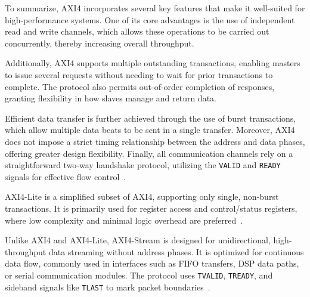 To summarize, AXI4 incorporates several key features that make it well-suited for high-performance systems. One of its core advantages is the use of independent read and write channels, which allows these operations to be carried out concurrently, thereby increasing overall throughput. 

Additionally, AXI4 supports multiple outstanding transactions, enabling masters to issue several requests without needing to wait for prior transactions to complete. The protocol also permits out-of-order completion of responses, granting flexibility in how slaves manage and return data. 

Efficient data transfer is further achieved through the use of burst transactions, which allow multiple data beats to be sent in a single transfer. Moreover, AXI4 does not impose a strict timing relationship between the address and data phases, offering greater design flexibility. Finally, all communication channels rely on a straightforward two-way handshake protocol, utilizing the \texttt{VALID} and \texttt{READY} signals for effective flow control~\cite{st_micheal_introduction_2019, the_art_of_verification_understanding_2021}.


AXI4-Lite is a simplified subset of AXI4, supporting only single, non-burst transactions. It is primarily used for register access and control/status registers, where low complexity and minimal logic overhead are preferred~\cite{arm_amba_2021}.

Unlike AXI4 and AXI4-Lite, AXI4-Stream is designed for unidirectional, high-throughput data streaming without address phases. It is optimized for continuous data flow, commonly used in interfaces such as FIFO transfers, DSP data paths, or serial communication modules. The protocol uses \texttt{TVALID}, \texttt{TREADY}, and sideband signals like \texttt{TLAST} to mark packet boundaries~\cite{arm_amba_2021-1}.

